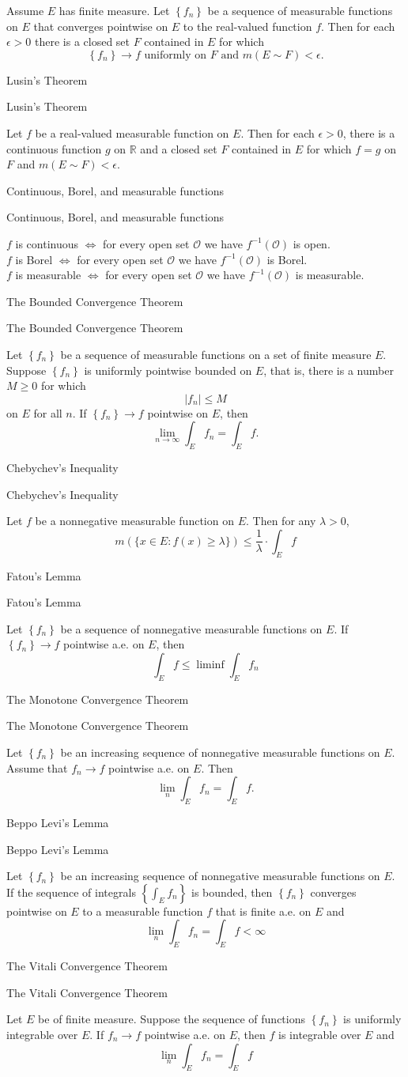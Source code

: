 \documentclass[17pt]{extarticle}
\newcommand{\boxset}[2]{\begin{mdframed}[style=darkQuesion]
#1
\end{mdframed}
\newpage
\begin{mdframed}[style=darkQuesion]
#1
  \end{mdframed}
\begin{mdframed}[style=darkAnswer]
#2
  \end{mdframed}
  \newpage
}
\begin{document}
{Assume $E$ has finite measure. Let $\left\{f_{n}\right\}$ be a sequence of measurable functions on $E$ that converges pointwise on $E$ to the real-valued function $f$. Then for each $\epsilon>0$ there is a closed set $F$ contained in $E$ for which
$$
\left\{f_{n}\right\} \rightarrow f \text { uniformly on } F \text { and } m(E \sim F)<\epsilon .
$$
}
\boxset{Lusin's Theorem }
{Let $f$ be a real-valued measurable function on $E$. Then for each $\epsilon>0$, there is a continuous function $g$ on $\mathbb{R}$ and a closed set $F$ contained in $E$ for which $f=g$ on $F$ and $m(E \sim F)<\epsilon$.}
\boxset{Continuous, Borel, and measurable functions}
{
$f$ is continuous $\Longleftrightarrow$ for every open set $\mathcal{O}$ we have $f^{-1}(\mathcal{O})$ is open.\[\ \]
$f$ is Borel $\Longleftrightarrow$ for every open set $\mathcal{O}$ we have $f^{-1}(\mathcal{O})$ is Borel.\[\ \]
$f$ is measurable $\Longleftrightarrow$ for every open set $\mathcal{O}$ we have $f^{-1}(\mathcal{O})$ is measurable.\[\ \]
}
\boxset{The Bounded Convergence Theorem}
{Let $\left\{f_{n}\right\}$ be a sequence of measurable functions on a set of finite measure $E$. Suppose $\left\{f_{n}\right\}$ is uniformly pointwise bounded on $E$, that is, there is a number $M \geq 0$ for which
$$
\left|f_{n}\right| \leq M
$$
on $E$ for all $n$. If $\left\{f_{n}\right\} \rightarrow f$ pointwise on $E$, then
$$
\lim _{n \rightarrow \infty} \int_{E} f_{n}=\int_{E} f .
$$
}
\boxset{Chebychev's Inequality}
{Let $f$ be a nonnegative measurable function on $E$. Then for any $\lambda>0$,
$$
m(\{x \in E: f(x) \geq \lambda\}) \leq \frac{1}{\lambda} \cdot \int_{E} f
$$
}
\boxset{Fatou's Lemma}
{Let $\left\{f_{n}\right\}$ be a sequence of nonnegative measurable functions on $E$. If $\left\{f_{n}\right\} \rightarrow f$ pointwise a.e. on $E$, then
$$
\int_{E} f \leq \liminf \int_{E} f_{n}
$$
}
\boxset{The Monotone Convergence Theorem}
{Let $\left\{f_{n}\right\}$ be an increasing sequence of nonnegative measurable functions on $E$. Assume that $f_{n} \rightarrow f$ pointwise a.e. on $E$. Then
$$
\lim _{n} \int_{E} f_{n}=\int_{E} f .
$$
}
\boxset{Beppo Levi's Lemma}
{Let $\left\{f_{n}\right\}$ be an increasing sequence of nonnegative measurable functions on $E$. If the sequence of integrals $\left\{\int_{E} f_{n}\right\}$ is bounded, then $\left\{f_{n}\right\}$ converges pointwise on $E$ to a measurable function $f$ that is finite a.e. on $E$ and
$$
\lim _{n} \int_{E} f_{n}=\int_{E} f<\infty
$$
}
\boxset{The Vitali Convergence Theorem}
{Let $E$ be of finite measure. Suppose the sequence of functions $\left\{f_{n}\right\}$ is uniformly integrable over $E$. If $f_{n} \rightarrow f$ pointwise a.e. on $E$, then $f$ is integrable over $E$ and
$$
\lim _{n} \int_{E} f_{n}=\int_{E} f
$$
}
\end{document}

